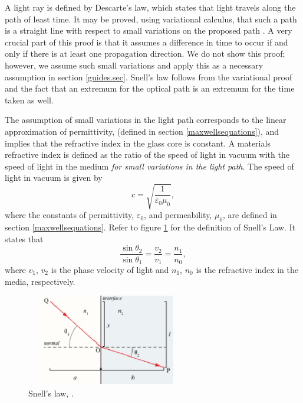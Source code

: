\documentclass[12pt]{article}
\theoremstyle{definition}
\numberwithin{equation}{section}
\begin{document}
A light ray is defined by Descarte's law, which states that light travels along the path of least time. It may be proved, using variational calculus, that such a path is a straight line with respect to small variations on the proposed path \cite{Sagan}. A very crucial part of this proof is that it assumes a difference in time to occur if and only if there is at least one propagation direction. We do not show this proof; however, we assume such small variations and apply this as a necessary assumption in section \ref{guides.sec}. Snell's law follows from the variational proof and the fact that an extremum for the optical path is an extremum for the time taken as well.

The assumption of small variations in the light path corresponds to the linear approximation of permittivity, (defined in section \ref{maxwellsequations}), and implies that the refractive index in the glass core is constant. A materials refractive index is defined as the ratio of the speed of light in vacuum with the speed of light in the medium \textit{for small variations in the light path}. The speed of light in vacuum is given by $$c=\sqrt{\frac{1}{\varepsilon_0\mu_0}},$$ where the constants of permittivity, $\varepsilon_0$, and permeability, $\mu_0$, are defined in section \ref{maxwellsequations}. Refer to figure \ref{figure2} for the definition of Snell's Law. It states that
$$\frac{\sin{\theta_2}}{\sin{\theta_1}}=\frac{v_2}{v_1}=\frac{n_1}{n_0},$$
where $v_1$, $v_2$ is the phase velocity of light and $n_1$, $n_0$ is the refractive index in the media, respectively.
\begin{figure}[h!]
\centerline{\includegraphics[height = 40mm, width=70mm, angle=0]{snellslaw2.eps}}
\caption{Snell's law, \cite{fig_2}.}
\label{figure2}
\end{figure}
\end{document}
